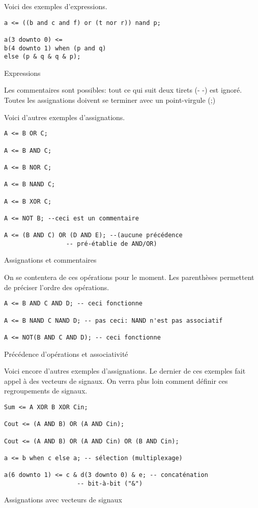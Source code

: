 \documentclass[11pt]{article}
\begin{document}
Voici des exemples d'expressions.
\begin{listing}[htbp]
\begin{verbatim}
a <= ((b and c and f) or (t nor r)) nand p;

a(3 downto 0) <=
b(4 downto 1) when (p and q)
else (p & q & q & p);
\end{verbatim}
\caption{Expressions}
\end{listing}

Les commentaires sont possibles: tout ce qui suit deux tirets (- -)
est ignoré.  Toutes les assignations doivent se terminer avec un
point-virgule (;)

Voici d'autres exemples d'assignations.

\begin{listing}[htbp]
\begin{verbatim}
A <= B OR C;

A <= B AND C;

A <= B NOR C;

A <= B NAND C;

A <= B XOR C;

A <= NOT B; --ceci est un commentaire

A <= (B AND C) OR (D AND E); --(aucune précédence 
			     -- pré-établie de AND/OR)
\end{verbatim}
\caption{Assignations et commentaires}
\end{listing}

On se contentera de ces opérations pour le moment. Les parenthèses
permettent de préciser l'ordre des opérations.

\begin{listing}[htbp]
\begin{verbatim}
A <= B AND C AND D; -- ceci fonctionne

A <= B NAND C NAND D; -- pas ceci: NAND n'est pas associatif

A <= NOT(B AND C AND D); -- ceci fonctionne
\end{verbatim}
\caption{Précédence d'opérations et associativité}
\end{listing}

Voici encore d'autres exemples d'assignations.  Le dernier de ces exemples
fait appel à des vecteurs de signaux. On verra plus loin comment
définir ces regroupements de signaux.


\begin{listing}[htbp]
\begin{verbatim}
Sum <= A XOR B XOR Cin;

Cout <= (A AND B) OR (A AND Cin);

Cout <= (A AND B) OR (A AND Cin) OR (B AND Cin);

a <= b when c else a; -- sélection (multiplexage)

a(6 downto 1) <= c & d(3 downto 0) & e; -- concaténation 
					-- bit-à-bit ("&")

\end{verbatim}
\caption{Assignations avec vecteurs de signaux}
\end{listing}
\end{document}
